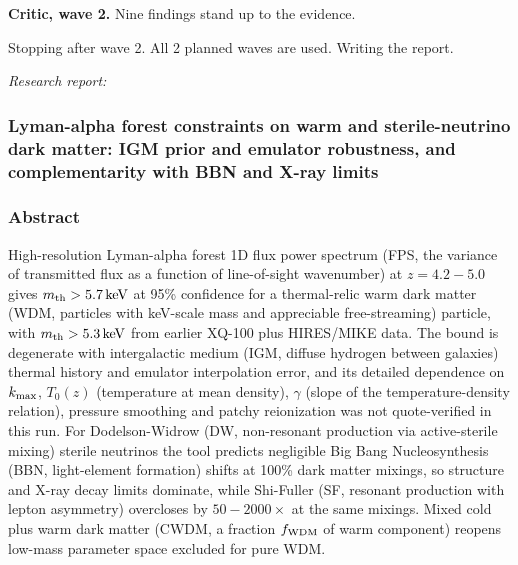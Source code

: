 \documentclass[11pt,a4paper]{article}
\begin{document}
\textbf{Critic, wave 2.} Nine findings stand up to the evidence.

Stopping after wave 2. All 2 planned waves are used. Writing the report.

\textit{Research report:}\par
\subsubsection*{Lyman-alpha forest constraints on warm and sterile-neutrino dark matter: IGM prior and emulator robustness, and complementarity with BBN and X-ray limits}
\subsubsection*{Abstract}
High-resolution Lyman-alpha forest 1D flux power spectrum (FPS, the variance of transmitted flux as a function of line-of-sight wavenumber) at $z = 4.2-5.0$ gives $m_{\rm th} > 5.7\,\mathrm{keV}$ at 95\% confidence for a thermal-relic warm dark matter (WDM, particles with keV-scale mass and appreciable free-streaming) particle, with $m_{\rm th} > 5.3\,\mathrm{keV}$ from earlier XQ-100 plus HIRES/MIKE data. The bound is degenerate with intergalactic medium (IGM, diffuse hydrogen between galaxies) thermal history and emulator interpolation error, and its detailed dependence on $k_{\rm max}$, $T_0(z)$ (temperature at mean density), $\gamma$ (slope of the temperature-density relation), pressure smoothing and patchy reionization was not quote-verified in this run. For Dodelson-Widrow (DW, non-resonant production via active-sterile mixing) sterile neutrinos the tool predicts negligible Big Bang Nucleosynthesis (BBN, light-element formation) shifts at 100\% dark matter mixings, so structure and X-ray decay limits dominate, while Shi-Fuller (SF, resonant production with lepton asymmetry) overcloses by $50-2000\times$ at the same mixings. Mixed cold plus warm dark matter (CWDM, a fraction $f_{\rm WDM}$ of warm component) reopens low-mass parameter space excluded for pure WDM.
\end{document}
